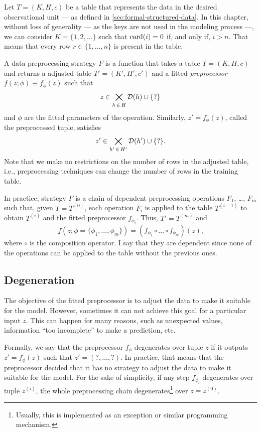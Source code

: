 Let $T = (K, H, c)$ be a table that represents the data in the desired observational unit
--- as defined in \cref{sec:formal-structured-data}.  In this chapter, without loss of
generality --- as the keys are not used in the modeling process ---, we can consider $K =
\{1, 2, \dots\}$ such that $\rowcard[i] = 0$ if, and only if, $i > n$.  That means that
every row $r \in \{1, \dots, n\}$ is present in the table.

A data preprocessing strategy $F$ is a function that takes a table $T = (K, H, c)$ and
returns a adjusted table $T' = (K', H', c')$ and a fitted \emph{preprocessor} $f(z; \phi)
\equiv f_\phi(z)$ such that $$z \in \bigtimes_{h\, \in\, H} \domainof{h} \cup \{?\}$$ and $\phi$ are
the fitted parameters of the operation.  Similarly, $z' = f_\phi(z)$, called the
preprocessed tuple, satisfies $$z' \in \bigtimes_{h'\, \in\, H'} \domainof{h'} \cup
\{?\}\text{.}$$ Note that we make no restrictions on the number of rows in the adjusted
table, i.e., preprocessing techniques can change the number of rows in the training table.

In practice, strategy $F$ is a chain of dependent preprocessing operations $F_1$, \dots,
$F_m$ such that, given $T = T^{(0)}$, each operation $F_i$ is applied to the table
$T^{(i-1)}$ to obtain $T^{(i)}$ and the fitted preprocessor $f_{\phi_i}$.  Thus, $T' =
T^{(m)}$ and $$f(z; \phi = \{\phi_1, \dots, \phi_m\}) = \left(f_{\phi_1} \circ \dots \circ
f_{\phi_m}\right)(z)\text{,}$$ where $\circ$ is the composition operator.  I say that
they are dependent since none of the operations can be applied to the table without the
previous ones.

\subsection{Degeneration}

The objective of the fitted preprocessor is to adjust the data to make it suitable for the
model.  However, sometimes it can not achieve this goal for a particular input $z$.  This
can happen for many reasons, such as unexpected values, information ``too incomplete'' to
make a prediction, etc.

Formally, we say that the preprocessor $f_\phi$ degenerates over tuple $z$ if it outputs
$z' = f_\phi(z)$ such that $z' = (?, \dots, ?)$.  In practice, that means that the
preprocessor decided that it has no strategy to adjust the data to make it suitable for
the model.  For the sake of simplicity, if any step $f_{\phi_i}$ degenerates over
tuple $z^{(i)}$, the whole preprocessing chain degenerates\footnote{Usually, this is
implemented as an exception or similar programming mechanism.} over $z = z^{(0)}$.


